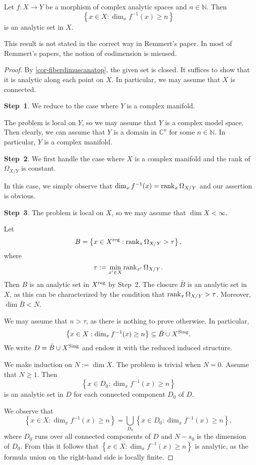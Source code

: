 \begin{corollary}[Remmert]\label{cor-fiberdimusczar}
    Let $f:X\rightarrow Y$ be a morphism of complex analytic spaces and $n\in \mathbb{N}$. 
    Then 
    \[
        \left\{ x\in X: \dim_x f^{-1}(x)\geq n \right\}  
    \]
    is an analytic set in $X$.
\end{corollary}
This result is not stated in the correct way in Remmert's paper. In most of Remmert's papers, the notion of codimension is misused.
\begin{proof}
    By \cref{cor-fiberdimuscanatop}, the given set is closed. It suffices to show that it is analytic along each point on $X$. In particular, we may assume that $X$ is connected.

    \textbf{Step~1}. We reduce to the case where $Y$ is a complex manifold.
    
    The problem is local on $Y$, so we may assume that  $Y$ is a complex model space. Then clearly, we can assume that $Y$ is a domain in $\mathbb{C}^n$ for some $n\in \mathbb{N}$. In particular, $Y$ is a complex manifold.


    \textbf{Step~2}. We first handle the case where $X$ is a complex manifold and the rank of $\Omega_{X/Y}$ is constant.

    In this case, we simply observe that $\dim_x f^{-1}(x)=\rank_x \Omega_{X/Y}$ and our assertion is obvious.

    \textbf{Step~3}. The problem is local on $X$, so we may assume that $\dim X<\infty$.

    Let 
    \[
        B=\left\{x\in X^{\operatorname{reg}}: \rank_x \Omega_{X/Y}>\tau \right\},  
    \]
    where 
    \[
        \tau:=  \min_{x'\in X}\rank_{x'} \Omega_{X/Y}.
    \]
    Then $B$ is an analytic set in $X^{\operatorname{reg}}$ by Step~2. The closure $\bar{B}$ is an analytic set in $X$, as this can be characterized by the condition that $\rank_x \Omega_{X/Y}>\tau$.
    Moreover, $\dim \bar{B}<N$. 
    
    We may assume that $n>\tau$, as there is nothing to prove otherwise. In particular,
    \[
        \left\{ x\in X: \dim_x f^{-1}(x)\geq n \right\}\subseteq \bar{B}\cup X^{\operatorname{Sing}}.  
    \]
    We write $D=\bar{B}\cup X^{\operatorname{Sing}}$ and endow it with the reduced induced structure.

    We make induction on $N:=\dim X$. The problem is trivial when $N=0$. Assume that $N\geq 1$. Then
    \[
        \left\{ x\in D_0: \dim_x f^{-1}(x)\geq n \right\}  
    \]
    is an analytic set in $D$ for each connected component $D_0$ of $D$.

    We observe that
    \[
        \left\{ x\in X: \dim_x f^{-1}(x)\geq n \right\}=\bigcup_{D_0} \left\{ x\in D_0: \dim_x f^{-1}(x)\geq n \right\},
    \]
    where $D_0$ runs over all connected components of $D$ and $N-s_0$ is the dimension of $D_0$. From this it follows that $\left\{ x\in X: \dim_x f^{-1}(x)\geq n \right\}$ is analytic, as the formula union on the right-hand side is locally finite.
\end{proof}

